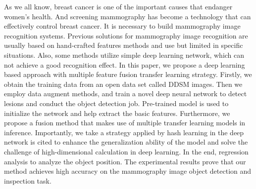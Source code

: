 As we all know, breast cancer is one of the 
important causes that endanger women’s health. 
And screening mammography has become a 
technology that can effectively control 
breast cancer. 
It is necessary to build 
mammography image recognition systems. 
Previous solutions for mammography image 
recognition are usually based on hand-crafted 
features methods and use but limited in 
specific situations. 
Also, some methods utilize simple deep 
learning network, which can not achieve a 
good recognition effect.
In this paper, we propose a deep learning based 
approach with multiple feature fusion transfer 
learning strategy. Firstly, we obtain the 
training data from an open data set called 
DDSM images. 
Then we employ data augment methods, and 
train a novel deep neural network to detect 
lesions and conduct the object detection job. 
Pre-trained model is used to initialize the 
network and help extract the basic features.
Furthermore, we propose a fusion method that 
makes use of multiple transfer learning models 
in inference. 
Importantly, we take a strategy applied by hash 
learning in the deep network is cited to 
enhance the generalization ability of the 
model and solve the challenge of 
high-dimensional calculation in deep learning. 
In the end, regression analysis to analyze 
the object position. 
The experimental results prove that our method 
achieves high accuracy on the mammography image 
object detection and inspection task.
